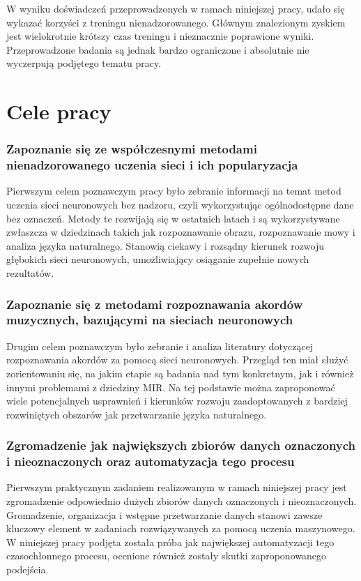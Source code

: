 W wyniku doświadczeń przeprowadzonych w ramach niniejszej pracy, udało się wykazać korzyści z treningu nienadzorowanego. Głównym znalezionym zyskiem jest wielokrotnie krótszy czas treningu i nieznacznie poprawione wyniki. Przeprowadzone badania są jednak bardzo ograniczone i absolutnie nie wyczerpują podjętego tematu pracy.



\section{Cele pracy}

\subsubsection{Zapoznanie się ze współczesnymi metodami nienadzorowanego uczenia sieci i ich popularyzacja}

Pierwszym celem poznawczym pracy było zebranie informacji na temat metod uczenia sieci neuronowych bez nadzoru, czyli wykorzystując ogólnodostępne dane bez oznaczeń. Metody te rozwijają się w ostatnich latach i są wykorzystywane zwłaszcza w dziedzinach takich jak rozpoznawanie obrazu, rozpoznawanie mowy i analiza języka naturalnego. Stanowią ciekawy i rozsądny kierunek rozwoju głębokich sieci neuronowych, umożliwiający osiąganie zupełnie nowych rezultatów.

\subsubsection{Zapoznanie się z metodami rozpoznawania akordów muzycznych, bazującymi na sieciach neuronowych}

Drugim celem poznawczym było zebranie i analiza literatury dotyczącej rozpoznawania akordów za pomocą sieci neuronowych. Przegląd ten miał służyć zorientowaniu się, na jakim etapie są badania nad tym konkretnym, jak i również innymi problemami z dziedziny MIR. Na tej podstawie można zaproponować wiele potencjalnych usprawnień i kierunków rozwoju zaadoptowanych z bardziej rozwiniętych obszarów jak przetwarzanie języka naturalnego.

\subsubsection{Zgromadzenie jak największych zbiorów danych oznaczonych i nieoznaczonych oraz automatyzacja tego procesu}

Pierwszym praktycznym zadaniem realizowanym w ramach niniejszej pracy jest zgromadzenie odpowiednio dużych zbiorów danych oznaczonych i nieoznaczonych. Gromadzenie, organizacja i wstępne przetwarzanie danych stanowi zawsze kluczowy element w zadaniach rozwiązywanych za pomocą uczenia maszynowego. W niniejszej pracy podjęta została próba jak największej automatyzacji tego czasochłonnego procesu, ocenione również zostały skutki zaproponowanego podejścia.

